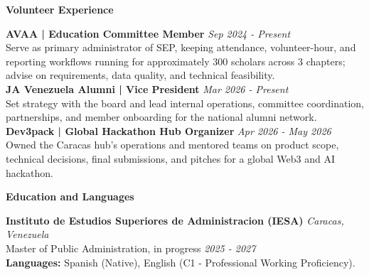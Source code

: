 \documentclass[10pt]{article}
\newcommand{\sectiontitle}[1]{%
    \vspace{3pt}
    \begin{center}
        \textbf{#1}
    \end{center}
    \vspace{-5pt}
}
\begin{document}
\sectiontitle{Volunteer Experience}
\textbf{AVAA | Education Committee Member} \hfill \textit{Sep 2024 - Present} \\
Serve as primary administrator of SEP, keeping attendance, volunteer-hour, and reporting workflows running for approximately 300 scholars across 3 chapters; advise on requirements, data quality, and technical feasibility. \\
\textbf{JA Venezuela Alumni | Vice President} \hfill \textit{Mar 2026 - Present} \\
Set strategy with the board and lead internal operations, committee coordination, partnerships, and member onboarding for the national alumni network. \\
\textbf{Dev3pack | Global Hackathon Hub Organizer} \hfill \textit{Apr 2026 - May 2026} \\
Owned the Caracas hub's operations and mentored teams on product scope, technical decisions, final submissions, and pitches for a global Web3 and AI hackathon.

\sectiontitle{Education and Languages}
\textbf{Instituto de Estudios Superiores de Administracion (IESA)} \hfill \textit{Caracas, Venezuela} \\
Master of Public Administration, in progress \hfill \textit{2025 - 2027} \\
\textbf{Languages:} Spanish (Native), English (C1 - Professional Working Proficiency).
\end{document}

